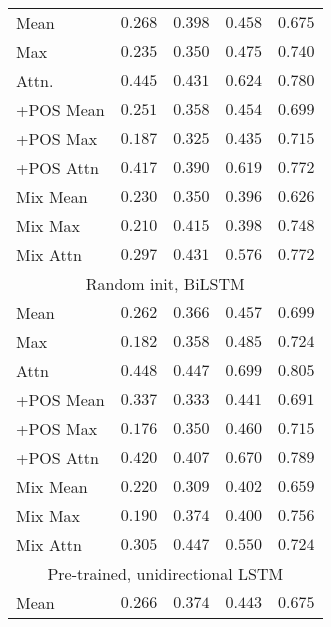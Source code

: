 \begin{table}
\begin{tabular}{lrrrr}
    Mean & $0.268$ & $0.398$ & $0.458$ & $0.675$ \\
    Max & $0.235$ & $0.350$ & $0.475$ & $0.740$ \\
    Attn. & $0.445$ & $0.431$ & $0.624$ & $0.780$ \\
    +POS Mean & $0.251$ & $0.358$ & $0.454$ & $0.699$ \\
    +POS Max & $0.187$ & $0.325$ & $0.435$ & $0.715$ \\
    +POS Attn & $0.417$ & $0.390$ & $0.619$ & $0.772$ \\
    Mix Mean & $0.230$ & $0.350$ & $0.396$ & $0.626$ \\
    Mix Max & $0.210$ & $0.415$ & $0.398$ & $0.748$ \\
    Mix Attn & $0.297$ & $0.431$ & $0.576$ & $0.772$ \\
    \midrule \multicolumn{5}{c}{Random init, BiLSTM} \\ \midrule
    Mean & $0.262$ & $0.366$ & $0.457$ & $0.699$ \\
    Max & $0.182$ & $0.358$ & $0.485$ & $0.724$ \\
    Attn & $\mathbf{0.448}$ & $0.447$ & $0.699$ & $0.805$ \\
    +POS Mean & $0.337$ & $0.333$ & $0.441$ & $0.691$ \\
    +POS Max & $0.176$ & $0.350$ & $0.460$ & $0.715$ \\
    +POS Attn & $0.420$ & $0.407$ & $0.670$ & $0.789$ \\
    Mix Mean & $0.220$ & $0.309$ & $0.402$ & $0.659$ \\
    Mix Max & $0.190$ & $0.374$ & $0.400$ & $0.756$ \\
    Mix Attn & $0.305$ & $0.447$ & $0.550$ & $0.724$ \\
    \midrule \multicolumn{5}{c}{Pre-trained, unidirectional LSTM} \\ \midrule
    Mean & $0.266$ & $0.374$ & $0.443$ & $0.675$ \\

\end{tabular}
\end{table}
